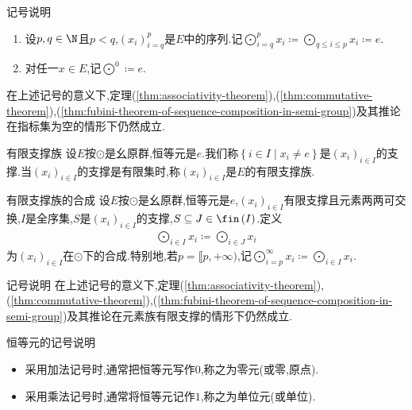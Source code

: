 \begin{remark}{记号说明}{}
	\begin{enumerate}
		\item 设$p,q\in\N$且$p<q$,$\left(x_{i}\right)_{i=q}^{p}$是$E$中的序列.记$\bigodot\limits_{i=q}^{p}x_{i}\coloneq\bigodot\limits_{q\leq i\leq p}x_{i}\coloneq e$.
		\item 对任一$x\in E$,记$\bigodot\limits^{0}\coloneq e$.
	\end{enumerate}
	在上述记号的意义下,定理(\cref{thm:associativity-theorem}),(\cref{thm:commutative-theorem}),(\cref{thm:fubini-theorem-of-sequence-composition-in-semi-group})及其推论在指标集为空的情形下仍然成立.
\end{remark}

\begin{definition}{有限支撑族}{}
	设$E$按$\odot$是幺原群,恒等元是$e$.我们称$\left\{i\in I\middle|x_{i}\neq e\right\}$是$\left(x_{i}\right)_{i\in I}$的支撑.当$\left(x_{i}\right)_{i\in I}$的支撑是有限集时,称$\left(x_{i}\right)_{i\in I}$是$E$的有限支撑族.
\end{definition}

\begin{definition}{有限支撑族的合成}{}
	设$E$按$\odot$是幺原群,恒等元是$e$,$\left(x_{i}\right)_{i\in I}$有限支撑且元素两两可交换,$I$是全序集,$S$是$\left(x_{i}\right)_{i\in I}$的支撑,$S\subseteq J\in\fin\left(I\right)$.定义
	\begin{align*}
		\bigodot\limits_{i\in I}x_{i}\coloneq\bigodot\limits_{i\in J}x_{i}
	\end{align*}
	为$\left(x_{i}\right)_{i\in I}$在$\odot$下的合成.特别地,若$p=\llbracket p,+\infty)$,记$\bigodot\limits_{i=p}^{\infty}x_{i}\coloneq\bigodot\limits_{i\in I}x_{i}$.
\end{definition}

\begin{remark}{记号说明}{}
	在上述记号的意义下,定理(\cref{thm:associativity-theorem}),(\cref{thm:commutative-theorem}),(\cref{thm:fubini-theorem-of-sequence-composition-in-semi-group})及其推论在元素族有限支撑的情形下仍然成立.
\end{remark}

\begin{remark}{恒等元的记号说明}{}
	\begin{itemize}
		\item 采用加法记号时,通常把恒等元写作$0$,称之为零元(或零,原点).
		\item 采用乘法记号时,通常将恒等元记作$1$,称之为单位元(或单位).
	\end{itemize}
\end{remark}